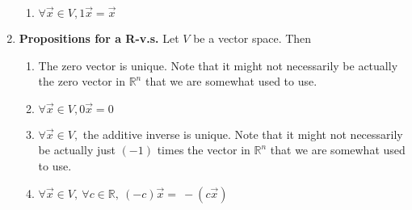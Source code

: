 \documentclass[12pt]{book}
\newcommand{\settag}[1]{\renewcommand{\theenumi}{#1}}
\begin{document}
\begin{enumerate}
\begin{enumerate}
        \item $\forall \vec{x} \in V, 1\vec{x} = \vec{x}$
    \end{enumerate}
    \settag{1.1.6}
    \item \textbf{Propositions for a R-v.s.} Let $V$ be a vector space. Then 
    \begin{enumerate}
        \item The zero vector is unique. Note that it might not necessarily be actually the zero vector in $\mathbb{R}^n$ that we are somewhat used to use.
        \item $\forall \vec{x} \in V, 0\vec{x}=0$
        \item $\forall \vec{x} \in V, $ the additive inverse is unique. Note that it might not necessarily be actually just $(-1)$ times the vector in $\mathbb{R}^n$ that we are somewhat used to use.
        \item $\forall \vec{x} \in V,~\forall c\in \mathbb{R}, ~(-c)\vec{x}=~-(c\vec{x})$
    \end{enumerate}
\end{enumerate}
\end{document}
